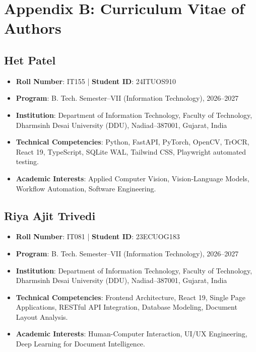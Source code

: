 \documentclass[12pt,letterpaper]{report}
\begin{document}
\chapter*{Appendix B: Curriculum Vitae of Authors}

\section*{Het Patel}
\begin{itemize}[leftmargin=1.5em]
    \item \textbf{Roll Number}: IT155 \quad | \quad \textbf{Student ID}: 24ITUOS910
    \item \textbf{Program}: B. Tech. Semester--VII (Information Technology), 2026--2027
    \item \textbf{Institution}: Department of Information Technology, Faculty of Technology, Dharmsinh Desai University (DDU), Nadiad--387001, Gujarat, India
    \item \textbf{Technical Competencies}: Python, FastAPI, PyTorch, OpenCV, TrOCR, React 19, TypeScript, SQLite WAL, Tailwind CSS, Playwright automated testing.
    \item \textbf{Academic Interests}: Applied Computer Vision, Vision-Language Models, Workflow Automation, Software Engineering.
\end{itemize}

\vspace{1.0cm}
\section*{Riya Ajit Trivedi}
\begin{itemize}[leftmargin=1.5em]
    \item \textbf{Roll Number}: IT081 \quad | \quad \textbf{Student ID}: 23ECUOG183
    \item \textbf{Program}: B. Tech. Semester--VII (Information Technology), 2026--2027
    \item \textbf{Institution}: Department of Information Technology, Faculty of Technology, Dharmsinh Desai University (DDU), Nadiad--387001, Gujarat, India
    \item \textbf{Technical Competencies}: Frontend Architecture, React 19, Single Page Applications, RESTful API Integration, Database Modeling, Document Layout Analysis.
    \item \textbf{Academic Interests}: Human-Computer Interaction, UI/UX Engineering, Deep Learning for Document Intelligence.
\end{itemize}
\end{document}

